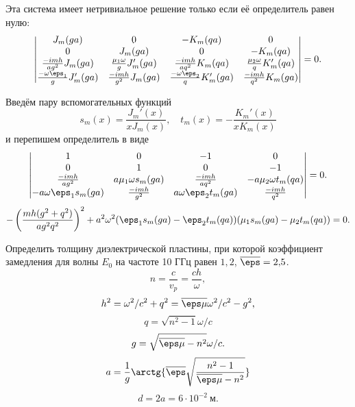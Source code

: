 Эта система имеет нетривиальное решение только если её определитель равен нулю:
\[
	\begin{vmatrix}
		J_m(ga) & 0 & -K_m(qa) & 0 \\
		0 & J_m(ga) & 0 & -K_m(qa) \\
		\frac{-imh}{ag^2}J_m(ga) & \frac{\mu_1\omega}{g}J_m'(ga) & \frac{-imh}{aq^2}K_m(qa) & \frac{\mu_2\omega}{q}K_m'(qa)\\
		\frac{-\omega\eps_1}{g}J_m'(ga) & \frac{-imh}{g^2}J_m(ga) & \frac{-\omega\eps_2}{q}K_m'(ga) & \frac{-imh}{q^2}K_m(ga)\\
	\end{vmatrix} = 0.
\]

Введём пару вспомогательных функций
\[
	s_m(x) = \frac{J_m'(x)}{xJ_m(x)},\quad
	t_m(x) = -\frac{K_m'(x)}{xK_m(x)}
\]
и перепишем определитель в виде
\[
	\begin{vmatrix}
		1 & 0 & -1 & 0 \\
		0 & 1 & 0 & -1 \\
		\frac{-imh}{ag^2} & a\mu_1\omega s_m(ga) & \frac{-imh}{aq^2} & -a\mu_2\omega t_m(qa)\\
		-a\omega\eps_1 s_m(ga) & \frac{-imh}{g^2} & a\omega\eps_2t_m(ga) & \frac{-imh}{q^2}\\
	\end{vmatrix} = 0.
\]
\[
	-\left(\frac{mh(g^2 + q^2)}{ag^2q^2}\right)^2 + a^2\omega^2(\eps_1s_m(ga) - \eps_2t_m(qa))(\mu_1 s_m(ga) - \mu_2 t_m(qa)) = 0.
\]

Определить толщину диэлектрической пластины, при которой коэффициент замедления для волны \(E_0\) на частоте 10 ГГц равен \( 1,\!2 \), \(\overline{\eps} = 2,\!5\).
\[
	n = \frac{c}{v_p} = \frac{ch}{\omega},
\]
\[
	h^2 = \omega^2/c^2 + q^2 = \overline{\eps\mu}\omega^2/c^2 - g^2,
\]
\[
	q = \sqrt{n^2 - 1}\omega/ c
\]
\[
	g = \sqrt{\overline{\eps\mu} - n^2}\omega / c. 
\]
\[
	a = \frac{1}{g}\arctg{\overline{\eps}\sqrt{\frac{n^2-1}{\overline{\eps\mu} - n^2}}}
\]
\[
	d = 2a = 6\cdot10^{-2}~\text{м}.
\]
